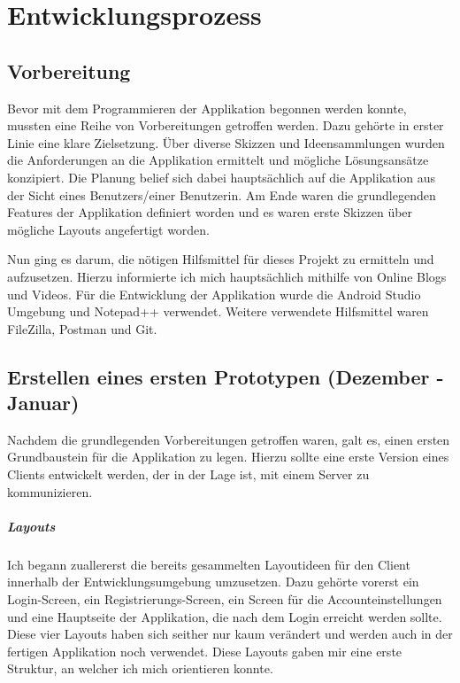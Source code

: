 \documentclass[../main.tex]{subfiles}
\begin{document}
	
	\chapter{Entwicklungsprozess}
	
	\section{Vorbereitung}
	Bevor mit dem Programmieren der Applikation begonnen werden konnte, mussten eine Reihe von Vorbereitungen getroffen werden. Dazu gehörte in erster Linie eine klare Zielsetzung. Über diverse Skizzen und Ideensammlungen wurden die Anforderungen an die Applikation ermittelt und mögliche Lösungsansätze konzipiert. Die Planung belief sich dabei hauptsächlich auf die Applikation aus der Sicht eines Benutzers/einer Benutzerin. Am Ende waren die grundlegenden Features der Applikation definiert worden und es waren erste Skizzen über mögliche Layouts angefertigt worden.
	
	Nun ging es darum, die nötigen Hilfsmittel für dieses Projekt zu ermitteln und aufzusetzen. Hierzu informierte ich mich hauptsächlich mithilfe von Online Blogs und Videos. Für die Entwicklung der Applikation wurde die Android Studio Umgebung und Notepad++ verwendet. Weitere verwendete Hilfsmittel waren FileZilla, Postman und Git.
	
	\section{Erstellen eines ersten Prototypen (Dezember - Januar)}
	Nachdem die grundlegenden Vorbereitungen getroffen waren, galt es, einen ersten Grundbaustein für die Applikation zu legen. Hierzu sollte eine erste Version eines Clients entwickelt werden, der in der Lage ist, mit einem Server zu kommunizieren.
	
	\paragraph{Layouts}
	Ich begann zuallererst die bereits gesammelten Layoutideen für den Client innerhalb der Entwicklungsumgebung umzusetzen. Dazu gehörte vorerst ein Login-Screen, ein Registrierungs-Screen, ein Screen für die Accounteinstellungen und eine Hauptseite der Applikation, die nach dem Login erreicht werden sollte. Diese vier Layouts haben sich seither nur kaum verändert und werden auch in der fertigen Applikation noch verwendet. Diese Layouts gaben mir eine erste Struktur, an welcher ich mich orientieren konnte.
	
\end{document}
